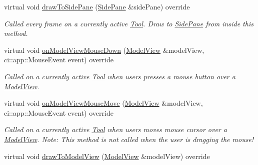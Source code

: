 \begin{DoxyCompactItemize}
virtual void \mbox{\hyperlink{classpepr3d_1_1_text_editor_a0bb2481c00c38ff55eab21baa66624dc}{draw\+To\+Side\+Pane}} (\mbox{\hyperlink{classpepr3d_1_1_side_pane}{Side\+Pane}} \&side\+Pane) override
\begin{DoxyCompactList}\small\item\em Called every frame on a currently active \mbox{\hyperlink{classpepr3d_1_1_tool}{Tool}}. Draw to \mbox{\hyperlink{classpepr3d_1_1_side_pane}{Side\+Pane}} from inside this method. \end{DoxyCompactList}\item 
\mbox{\label{classpepr3d_1_1_text_editor_ac670b5620dda898d049c395c5b899b3f}} 
virtual void \mbox{\hyperlink{classpepr3d_1_1_text_editor_ac670b5620dda898d049c395c5b899b3f}{on\+Model\+View\+Mouse\+Down}} (\mbox{\hyperlink{classpepr3d_1_1_model_view}{Model\+View}} \&model\+View, ci\+::app\+::\+Mouse\+Event event) override
\begin{DoxyCompactList}\small\item\em Called on a currently active \mbox{\hyperlink{classpepr3d_1_1_tool}{Tool}} when users presses a mouse button over a \mbox{\hyperlink{classpepr3d_1_1_model_view}{Model\+View}}. \end{DoxyCompactList}\item 
\mbox{\label{classpepr3d_1_1_text_editor_a7598ba82ef36ae87f0317fe18c800bcb}} 
virtual void \mbox{\hyperlink{classpepr3d_1_1_text_editor_a7598ba82ef36ae87f0317fe18c800bcb}{on\+Model\+View\+Mouse\+Move}} (\mbox{\hyperlink{classpepr3d_1_1_model_view}{Model\+View}} \&model\+View, ci\+::app\+::\+Mouse\+Event event) override
\begin{DoxyCompactList}\small\item\em Called on a currently active \mbox{\hyperlink{classpepr3d_1_1_tool}{Tool}} when users moves mouse cursor over a \mbox{\hyperlink{classpepr3d_1_1_model_view}{Model\+View}}. Note\+: This method is not called when the user is dragging the mouse! \end{DoxyCompactList}\item 
\mbox{\label{classpepr3d_1_1_text_editor_aae35d8a952efd0493c5a12031054b783}} 
virtual void \mbox{\hyperlink{classpepr3d_1_1_text_editor_aae35d8a952efd0493c5a12031054b783}{draw\+To\+Model\+View}} (\mbox{\hyperlink{classpepr3d_1_1_model_view}{Model\+View}} \&model\+View) override

\end{DoxyCompactItemize}
